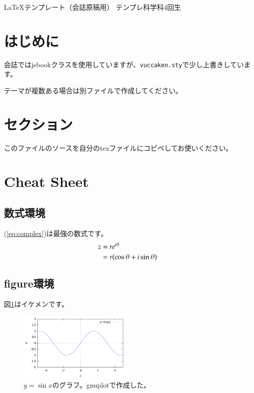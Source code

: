 \documentclass[10pt,b5paper,papersize,dvipdfmx]{jsbook}
\begin{document}


\kaishititle%
  {\LaTeX テンプレート（会誌原稿用）}%
  {テンプレ科学科4回生}%
  {}%

%
\section*{はじめに}
会誌ではjsbookクラスを使用していますが、\texttt{vuccaken.sty}で少し上書きしています。\par
テーマが複数ある場合は別ファイルで作成してください。

%
\section{セクション}
このファイルのソースを自分のtexファイルにコピペしてお使いください。

%
\section{Cheat Sheet}

\subsection{数式環境}
(\ref{eq:complex})は最強の数式です。
\begin{align}
  z &= r e^{i\theta} \notag \\
    &= r (\cos\theta + i\sin\theta) \label{eq:complex}
\end{align}

\subsection{figure環境}
図\ref{fig:sin}はイケメンです。
\begin{figure}[htbp]
  \centering
  \includegraphics[width=0.5\textwidth]{img/fig-sin.pdf}
  \caption{$y=\sin x$のグラフ。gnuplotで作成した。}
  \label{fig:sin}
\end{figure}
\end{document}
